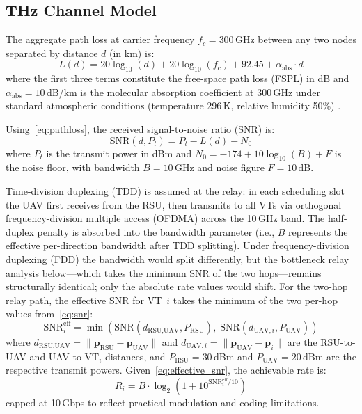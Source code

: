 \documentclass[journal]{IEEEtran}
\begin{document}
\subsection{THz Channel Model}

The aggregate path loss at carrier frequency $f_c = 300$\,GHz between any two nodes separated by distance $d$ (in km) is:
\begin{equation}
    L(d) = 20\log_{10}(d) + 20\log_{10}(f_c) + 92.45 + \alpha_\text{abs} \cdot d
    \label{eq:pathloss}
\end{equation}
where the first three terms constitute the free-space path loss (FSPL) in dB and $\alpha_\text{abs} = 10$\,dB/km is the molecular absorption coefficient at 300\,GHz under standard atmospheric conditions (temperature 296\,K, relative humidity 50\%) \cite{jornet2011, han2022}.

Using~\eqref{eq:pathloss}, the received signal-to-noise ratio (SNR) is:
\begin{equation}
    \text{SNR}(d, P_t) = P_t - L(d) - N_0
    \label{eq:snr}
\end{equation}
where $P_t$ is the transmit power in dBm and $N_0 = -174 + 10\log_{10}(B) + F$ is the noise floor, with bandwidth $B = 10$\,GHz and noise figure $F = 10$\,dB.

Time-division duplexing (TDD) is assumed at the relay: in each scheduling slot the UAV first receives from the RSU, then transmits to all VTs via orthogonal frequency-division multiple access (OFDMA) across the 10\,GHz band. The half-duplex penalty is absorbed into the bandwidth parameter (i.e., $B$ represents the effective per-direction bandwidth after TDD splitting). Under frequency-division duplexing (FDD) the bandwidth would split differently, but the bottleneck relay analysis below---which takes the minimum SNR of the two hops---remains structurally identical; only the absolute rate values would shift. For the two-hop relay path, the effective SNR for VT~$i$ takes the minimum of the two per-hop values from~\eqref{eq:snr}:
\begin{equation}
    \text{SNR}_i^\text{eff} = \min\!\left(\text{SNR}(d_{\text{RSU},\text{UAV}}, P_\text{RSU}),\; \text{SNR}(d_{\text{UAV},i}, P_\text{UAV})\right)
    \label{eq:effective_snr}
\end{equation}
where $d_{\text{RSU},\text{UAV}} = \|\mathbf{p}_\text{RSU} - \mathbf{p}_\text{UAV}\|$ and $d_{\text{UAV},i} = \|\mathbf{p}_\text{UAV} - \mathbf{p}_i\|$ are the RSU-to-UAV and UAV-to-VT$_i$ distances, and $P_\text{RSU} = 30$\,dBm and $P_\text{UAV} = 20$\,dBm are the respective transmit powers. Given~\eqref{eq:effective_snr}, the achievable rate is:
\begin{equation}
    R_i = B \cdot \log_2\!\left(1 + 10^{\text{SNR}_i^\text{eff}/10}\right)
    \label{eq:rate}
\end{equation}
capped at 10\,Gbps to reflect practical modulation and coding limitations.
\end{document}
